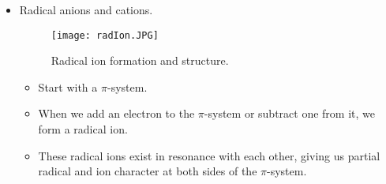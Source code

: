 \documentclass[../notes.tex]{subfiles}
\begin{document}
\begin{itemize}
\begin{itemize}
        \item However, they can also diffuse out of the cage, drifting apart to yield 2  in solution.
        \begin{itemize}
            \item These "free" radicals can then combine again to form .
            \item Or, alternatively, they can interact with a radical scavenger (such as a thiol\footnote{Alison Wendlandt uses thiols (such as adamantane thiol, ) as HAD sources in her research!}) in solution.
        \end{itemize}
        \item Notes on the cage effect.
        \begin{itemize}
            \item A more viscous solvent makes it harder to escape the cage.
            \item A scavenger can differentiate pathways.
            \item Stereoretentive radical reactions can occur within a radical cage, because combination within the cage can outcompete stereoinversion.
            \begin{itemize}
                \item However, if you diffuse out of the cage, forget it.
                \item Takeaway: Cages can have stereochemical consequences, such as retention.
            \end{itemize}
        \end{itemize}
        \item I need to do more reading on this and figure out exactly what I'm responsible for here!!
    \end{itemize}
    \item Radical anions and cations.
    \begin{figure}[h!]
        \centering
        \texttt{[image: radIon.JPG]}
        \caption{Radical ion formation and structure.}
        \label{fig:radIon}
    \end{figure}
    \begin{itemize}
        \item Start with a $\pi$-system.
        \item When we add an electron to the $\pi$-system or subtract one from it, we form a radical ion.
        \item These radical ions exist in resonance with each other, giving us partial radical and ion character at both sides of the $\pi$-system.

\end{itemize}
\end{itemize}
\end{document}

